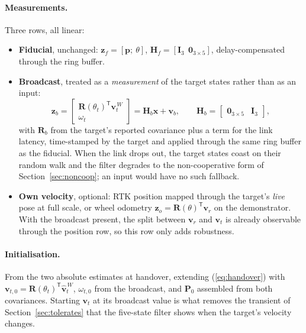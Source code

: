 \documentclass[11pt,a4paper]{article}
\newcommand{\vect}[1]{\bm{#1}}
\newcommand{\mat}[1]{\bm{#1}}
\newcommand{\T}{^{\mathsf{T}}}
\newcommand{\Rot}{\mat{R}}
\begin{document}
\paragraph{Measurements.} Three rows, all linear:
\begin{itemize}[nosep]
  \item \textbf{Fiducial}, unchanged: $\vect z_f = [\vect p;\ \theta]$, $\mat H_f = [\mat I_3\ \ \mat 0_{3\times 5}]$, delay-compensated through the ring buffer.
  \item \textbf{Broadcast}, treated as a \emph{measurement} of the target states rather than as an input:
  \begin{equation}
  \vect z_b = \begin{bmatrix}\Rot(\theta_t)\T\vect v_t^{\,W}\\ \omega_t\end{bmatrix} = \mat H_b\vect x + \vect v_b,\qquad
  \mat H_b = \begin{bmatrix}\mat 0_{3\times 5} & \mat I_3\end{bmatrix},
  \end{equation}
  with $\mat R_b$ from the target's reported covariance plus a term for the link latency, time-stamped by the target and applied through the same ring buffer as the fiducial. When the link drops out, the target states coast on their random walk and the filter degrades to the non-cooperative form of Section~\ref{sec:noncoop}; an input would have no such fallback.
  \item \textbf{Own velocity}, optional: RTK position mapped through the target's \emph{live} pose at full scale, or wheel odometry $\vect z_o = \Rot(\theta)\T\vect v_r$ on the demonstrator. With the broadcast present, the split between $\vect v_r$ and $\vect v_t$ is already observable through the position row, so this row only adds robustness.
\end{itemize}

\paragraph{Initialisation.} From the two absolute estimates at handover, extending (\ref{eq:handover}) with $\vect v_{t,0} = \Rot(\theta_t)\T\hat{\vect v}_t^{\,W}$, $\omega_{t,0}$ from the broadcast, and $\mat P_0$ assembled from both covariances. Starting $\vect v_t$ at its broadcast value is what removes the transient of Section~\ref{sec:tolerates} that the five-state filter shows when the target's velocity changes.
\end{document}
